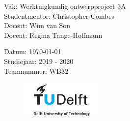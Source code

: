 \begin{titlepage}
\begin{flushleft}
 \begin{minipage}{.5\linewidth}
    \begin{flushleft}
      Vak:  Werktuigkundig ontwerpproject 3A\\
      Studentmentor: Christopher Combes\\
      Docent: Wim van Son \\
      Docent: Regina Tange-Hoffmann
    \end{flushleft}
  \end{minipage}
  \hfill
  \begin{minipage}{.45\linewidth}
    \begin{flushright}
    Datum: \today\\
    Studiejaar: 2019 - 2020\\
    Teamnummer: WB32
    \end{flushright} 
\end{minipage}

\begin{figure}[h]
    \centering
    \includegraphics[width = 40mm]{01_title/TUDELFT_LOGO.png}
\end{figure}
  
  
\cleardoublepage
\thispagestyle{empty}
\end{flushleft}

\clearpage
\thispagestyle{empty}
\end{titlepage}